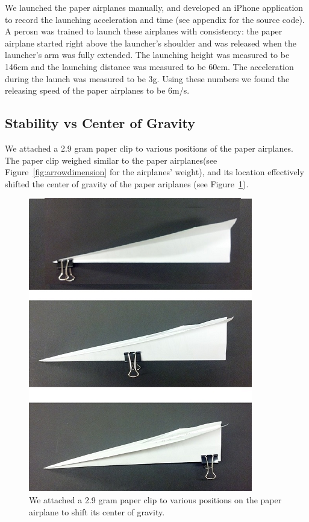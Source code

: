We launched the paper airplanes manually, and developed an iPhone application to record the launching acceleration and time (see appendix for the source code). A perosn was trained to launch these airplanes with consistency: the paper airplane started right above the launcher's shoulder and was released when the launcher's arm was fully extended. The launching height was measured to be 146cm and the launching distance was measured to be 60cm. The acceleration during the launch was measured to be 3g. Using these numbers we found the releasing speed of the paper airplanes to be 6m/s. 

\subsection{Stability vs Center of Gravity}
\label{sec:centergravity}
We attached a 2.9 gram paper clip to various positions of the paper airplanes. The paper clip weighed similar to the paper airplanes(see Figure~\ref{fig:arrowdimension} for the airplanes' weight), and its location effectively shifted the center of gravity of the paper ariplanes (see Figure~\ref{fig:clip}).

\begin{figure}[hl]
	\centering
		\includegraphics[scale=0.6]{figures/clip.png}
		\caption{We attached a 2.9 gram paper clip to various positions on the paper airplane to shift its center of gravity.}
	\label{fig:clip}
\end{figure}


